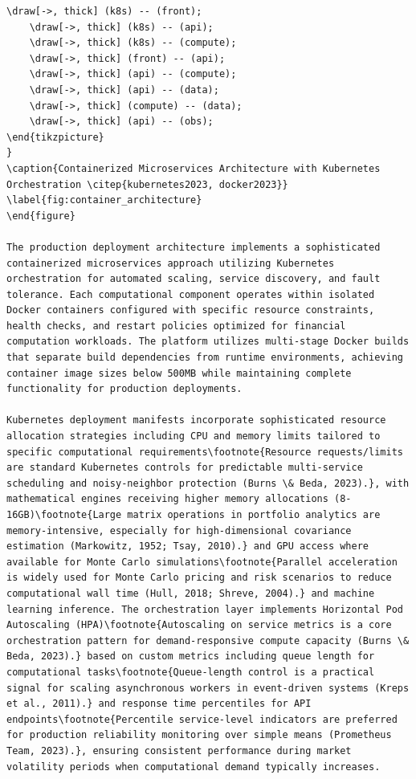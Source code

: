 \documentclass[12pt,a4paper]{article}
\theoremstyle{definition}
\theoremstyle{remark}
\begin{document}
\begin{lstlisting}[caption=Web Application Data Streaming]
    \draw[->, thick] (k8s) -- (front);
    \draw[->, thick] (k8s) -- (api);
    \draw[->, thick] (k8s) -- (compute);
    \draw[->, thick] (front) -- (api);
    \draw[->, thick] (api) -- (compute);
    \draw[->, thick] (api) -- (data);
    \draw[->, thick] (compute) -- (data);
    \draw[->, thick] (api) -- (obs);
\end{tikzpicture}
}
\caption{Containerized Microservices Architecture with Kubernetes Orchestration \citep{kubernetes2023, docker2023}}
\label{fig:container_architecture}
\end{figure}

The production deployment architecture implements a sophisticated containerized microservices approach utilizing Kubernetes orchestration for automated scaling, service discovery, and fault tolerance. Each computational component operates within isolated Docker containers configured with specific resource constraints, health checks, and restart policies optimized for financial computation workloads. The platform utilizes multi-stage Docker builds that separate build dependencies from runtime environments, achieving container image sizes below 500MB while maintaining complete functionality for production deployments.

Kubernetes deployment manifests incorporate sophisticated resource allocation strategies including CPU and memory limits tailored to specific computational requirements\footnote{Resource requests/limits are standard Kubernetes controls for predictable multi-service scheduling and noisy-neighbor protection (Burns \& Beda, 2023).}, with mathematical engines receiving higher memory allocations (8-16GB)\footnote{Large matrix operations in portfolio analytics are memory-intensive, especially for high-dimensional covariance estimation (Markowitz, 1952; Tsay, 2010).} and GPU access where available for Monte Carlo simulations\footnote{Parallel acceleration is widely used for Monte Carlo pricing and risk scenarios to reduce computational wall time (Hull, 2018; Shreve, 2004).} and machine learning inference. The orchestration layer implements Horizontal Pod Autoscaling (HPA)\footnote{Autoscaling on service metrics is a core orchestration pattern for demand-responsive compute capacity (Burns \& Beda, 2023).} based on custom metrics including queue length for computational tasks\footnote{Queue-length control is a practical signal for scaling asynchronous workers in event-driven systems (Kreps et al., 2011).} and response time percentiles for API endpoints\footnote{Percentile service-level indicators are preferred for production reliability monitoring over simple means (Prometheus Team, 2023).}, ensuring consistent performance during market volatility periods when computational demand typically increases.


\end{lstlisting}
\end{document}
